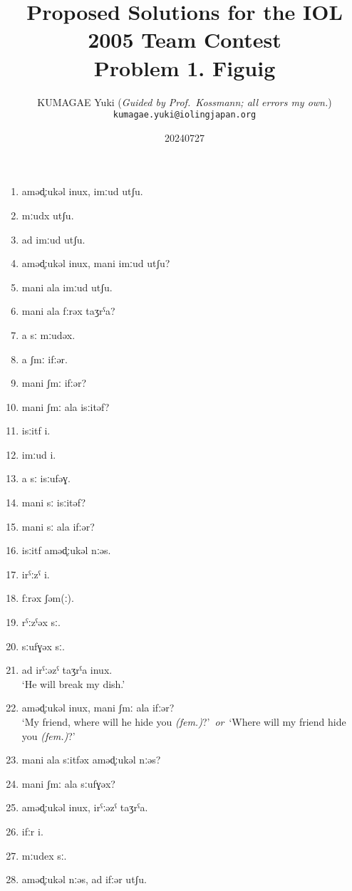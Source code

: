 \documentclass[14pt]{extarticle}
\title{\Large Proposed Solutions for the IOL 2005 Team Contest\\\large Problem 1. Figuig}
\author{KUMAGAE Yuki (\emph{Guided by Prof.\ Kossmann; all errors my own.})\\
{\small\texttt{kumagae.yuki@iolingjapan.org}}}
\date{20240727}
\begin{document}
\pagestyle{empty}
\maketitle
\thispagestyle{empty}


\begin{multicols}{2}
\begin{enumerate}
    \item aməd̥ːukəl inux, imːud utʃu.
    \item mːudx utʃu.
    \item ad imːud utʃu.
    \item aməd̥ːukəl inux, mani imːud utʃu?
    \item mani ala imːud utʃu.
    \item mani ala fːrəx taʒrˁa?
    \item a sː mːudəx.
    \item a ʃmː ifːər.
    \item mani ʃmː ifːər?
    \item mani ʃmː ala isːitəf?
    \item isːitf i.
    \item imːud i.
    \item a sː isːufəɣ.
    \item mani sː isːitəf?
    \item mani sː ala ifːər?
    \item isːitf aməd̥ːukəl nːəs.
    \item irˁːzˁ i.
    \item fːrəx ʃəm(ː).
    \item rˁːzˁəx sː.
    \item sːufɣəx sː.
    \item ad irˁːəzˁ taʒrˁa inux.\\`He will break my dish.'
    \item aməd̥ːukəl inux, mani ʃmː ala ifːər?\\`My friend, where will he hide you \textit{(fem.)}?'\ \textit{or}\ `Where will my friend hide you \textit{(fem.)}?'
    \item mani ala sːitfəx aməd̥ːukəl nːəs?
    \item mani ʃmː ala sːufɣəx?
    \item aməd̥ːukəl inux, irˁːəzˁ taʒrˁa.
    \item ifːr i.
    \item mːudex sː.
    \item aməd̥ːukəl nːəs, ad ifːər utʃu.
\end{enumerate}
\end{multicols}
\end{document}
